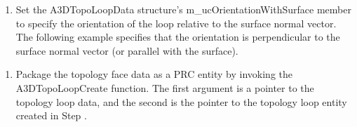 \documentclass[letterpaper,12pt,english,openany,oneside]{sphinxmanual}
\begin{document}
\begin{sphinxVerbatim}[commandchars=\\\{\}]
 
  
  
\end{sphinxVerbatim}
\begin{enumerate}
%
\setcounter{enumi}{4}
\item {} 
Set the A3DTopoLoopData structure’s m\_ucOrientationWithSurface member to specify the orientation of the loop relative to the surface normal vector. The following example specifies that the orientation is perpendicular to the surface normal vector (or parallel with the surface).

\end{enumerate}

\begin{sphinxVerbatim}[commandchars=\\\{\}]
  
\end{sphinxVerbatim}
\begin{enumerate}
%
\setcounter{enumi}{5}
\item {} 
Package the topology face data as a PRC entity by invoking the A3DTopoLoopCreate function. The first argument is a pointer to the topology loop data, and the second is the pointer to the topology loop entity created in Step .

\end{enumerate}

\begin{sphinxVerbatim}[commandchars=\\\{\}]
  
\end{sphinxVerbatim}
\end{document}
